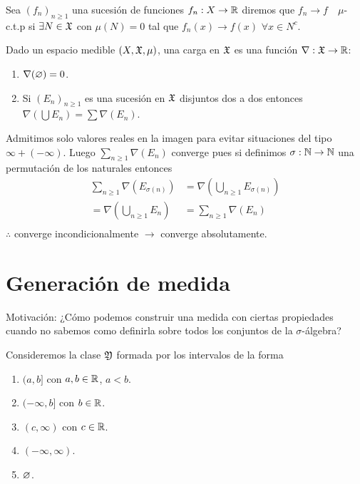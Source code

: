 \begin{eg}
    Sea $(f_n)_{n \geq 1}$ una sucesión de funciones $f_n : X \to \mathbb{R}$ diremos que $f_n \to f \quad \mu$-c.t.p si $\exists N \in \mathfrak{X}$ con $\mu(N) = 0$ tal que
    $f_n(x) \to f(x)$ $\forall x \in N^c$.
\end{eg}
\clearpage
\begin{definition}[Carga]
    Dado un espacio medible $(X, \mathfrak{X}, \mu)$, una carga en $\mathfrak{X}$ es una función $\nabla : \mathfrak{X} \to \mathbb{R}$: \begin{enumerate}
        \item $\nabla(\varnothing) = 0$.
        \item Si $(E_n)_{n \geq 1}$ es una sucesión en $\mathfrak{X}$ disjuntos dos a dos entonces $\nabla(\bigcup E_n) = \sum \nabla(E_n)$.
    \end{enumerate}

    Admitimos solo valores reales en la imagen para evitar situaciones del tipo $\infty + (-\infty)$.
    Luego $\sum_{n \geq 1} \nabla(E_n)$ converge pues si definimos $\sigma : \mathbb{N} \to \mathbb{N}$ una permutación de los naturales entonces
    \begin{align*}
        \sum_{n \geq 1} \nabla(E_{\sigma(n)}) & = \nabla (\bigcup_{n \geq 1} E_{\sigma(n)}) \\
        = \nabla (\bigcup_{n \geq 1} E_n)       & = \sum_{n \geq 1} \nabla(E_{n})             \\
    \end{align*}
    $\therefore$ converge incondicionalmente $\to$ converge absolutamente.
\end{definition}

\section{Generación de medida}

Motivación: ¿Cómo podemos construir una medida con ciertas propiedades
cuando no sabemos como definirla sobre todos los conjuntos de la $\sigma$-álgebra?

Consideremos la clase $\mathfrak{Y}$ formada por los intervalos de la forma \begin{enumerate}
    \item $(a, b]$ con $a, b \in \mathbb{R}$, $a<b$.
    \item $(-\infty, b]$ con $b \in \mathbb{R}$.
    \item $(c, \infty)$ con $c \in \mathbb{R}$.
    \item $(-\infty, \infty)$.
    \item $\varnothing$.
\end{enumerate}

